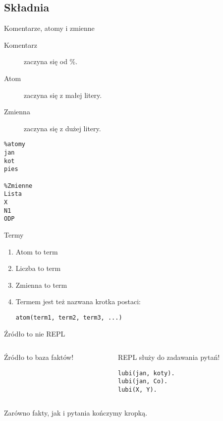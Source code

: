 \documentclass[blue]{beamer}
\begin{document}
\subsection{Składnia}
\begin{frame}[fragile]{Komentarze, atomy i zmienne}
\begin{description}
\item[Komentarz] zaczyna się od \%.
\item[Atom] zaczyna się z małej litery.
\item[Zmienna] zaczyna się z dużej litery.\
\end{description}
\begin{lstlisting}
%atomy
jan
kot
pies

%Zmienne
Lista
X
N1
ODP
\end{lstlisting}
\end{frame}
\begin{frame}[fragile]{Termy}
\begin{enumerate}
\item Atom to term
\item Liczba to term
\item Zmienna to term
\item Termem jest też nazwana krotka postaci:
\begin{lstlisting}
atom(term1, term2, term3, ...)
\end{lstlisting}
\end{enumerate}
\end{frame}
\begin{frame}[fragile]{Źródło to nie REPL}
\begin{columns}
\begin{column}{.5\linewidth}
Źródło to baza faktów!


\end{column}
\begin{column}{.5\linewidth}
REPL służy do zadawania pytań!

\begin{lstlisting}
lubi(jan, koty).
lubi(jan, Co).
lubi(X, Y).
\end{lstlisting}
\end{column}
\end{columns}
Zarówno fakty, jak i pytania kończymy kropką.
\end{frame}
\end{document}
